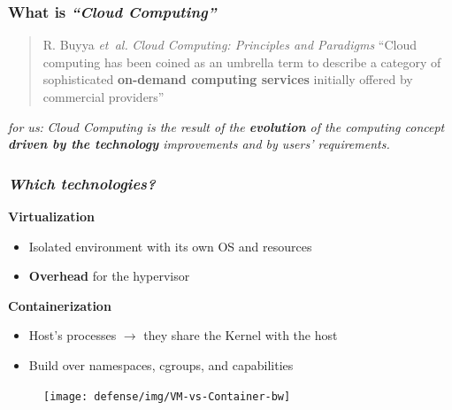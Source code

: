 \begin{frame}
  \frametitle{ What is \textit{``Cloud Computing''}}

  \begin{quote}{R. Buyya \emph{et~al.} \textit{Cloud Computing: Principles and Paradigms}}
    ``Cloud computing has been coined as an umbrella term to describe a category of
    sophisticated \alert{\textbf{on-demand computing services}} initially offered by commercial providers''
  \end{quote}

  \pause

  \begin{block}{ \textit{for us:}}
    \textit{
      Cloud Computing is the result of the \alert{\textbf{evolution}} of the computing concept
      \alert{\textbf{driven by the technology}} improvements and by users’ requirements.
    }
  \end{block}
\end{frame}

\begin{frame}
  \frametitle{ \textit{Which
      technologies?}}

   \textbf{Virtualization}
  \begin{itemize}
    \itemsep0em
    \item Isolated environment with its own OS and resources
    \item \textbf{\alert{Overhead}} for the \alert{hypervisor}
  \end{itemize}

  \pause

   \textbf{Containerization}
  \begin{itemize}
    \itemsep0em
    \item Host's \alert{processes} $\to$ they share the Kernel with the host
    \item Build over \alert{namespaces}, \alert{cgroups}, and \alert{capabilities}
  \end{itemize}

  \pause

   \begin{figure}
    \centering
    \texttt{[image: defense/img/VM-vs-Container-bw]}
  \end{figure}
\end{frame}

